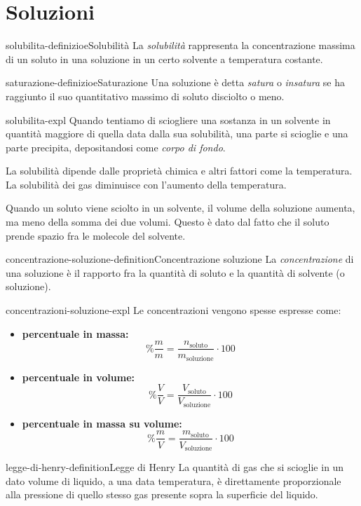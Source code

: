 \documentclass[preview]{standalone}
\begin{document}
\genpage

\section{Soluzioni}

\begin{snippetdefinition}{solubilita-definizioe}{Solubilità}
    La \textit{solubilità} rappresenta la concentrazione massima di un soluto
    in una soluzione in un certo solvente a temperatura costante.
\end{snippetdefinition}

\begin{snippetdefinition}{saturazione-definizioe}{Saturazione}
    Una soluzione è detta \textit{satura} o \textit{insatura}
    se ha raggiunto il suo quantitativo massimo di soluto disciolto o meno.
\end{snippetdefinition}

\begin{snippet}{solubilita-expl}
    Quando tentiamo di sciogliere una sostanza in un solvente in quantità maggiore
    di quella data dalla sua solubilità, una parte si scioglie e una parte precipita,
    depositandosi come \textit{corpo di fondo}.

    La solubilità dipende dalle proprietà chimica e altri fattori come la temperatura. \\
    La solubilità dei gas diminuisce con l'aumento della temperatura.

    Quando un soluto viene sciolto in un solvente, il volume della soluzione aumenta,
    ma meno della somma dei due volumi. Questo è dato dal fatto che il soluto prende spazio fra le molecole del solvente.
\end{snippet}

\begin{snippetdefinition}{concentrazione-soluzione-definition}{Concentrazione soluzione}
    La \textit{concentrazione} di una soluzione è il rapporto
    fra la quantità di soluto e la quantità di solvente (o soluzione).
\end{snippetdefinition}

\begin{snippet}{concentrazioni-soluzione-expl}
    Le concentrazioni vengono spesse espresse come:
    \begin{itemize}
        \item \textbf{percentuale in massa: }
        \[\%\frac{m}{m} = \frac{n_{\text{soluto}}}{m_{\text{soluzione}}}\cdot100\]
    
        \item \textbf{percentuale in volume: }
        \[\%\frac{V}{V} = \frac{V_{\text{soluto}}}{V_{\text{soluzione}}}\cdot100\]
    
        \item \textbf{percentuale in massa su volume: }
        \[\%\frac{m}{V} = \frac{m_{\text{soluto}}}{V_{\text{soluzione}}}\cdot100\]
    \end{itemize}
\end{snippet}

\begin{snippetdefinition}{legge-di-henry-definition}{Legge di Henry}
    La quantità di gas che si scioglie in un dato volume di liquido, a una data temperatura, è direttamente
    proporzionale alla pressione di quello stesso gas presente sopra la superficie del liquido.
\end{snippetdefinition}
\end{document}
